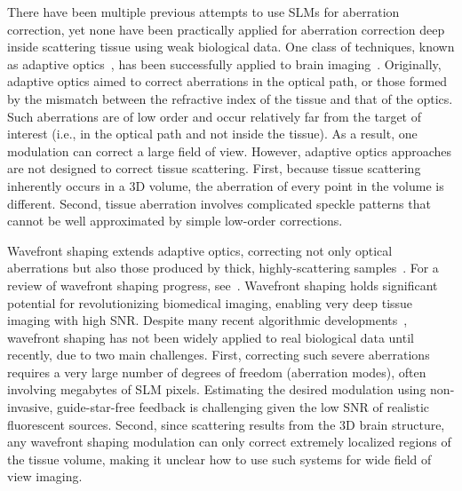  
 There have been multiple previous attempts to use SLMs for aberration correction, yet none have been practically applied for aberration correction deep inside scattering tissue using weak biological data. One class of techniques, known as adaptive optics~\cite{Booth2014,Ji2017review,HampsonBooth21review,wang2015direct}, has been successfully applied to brain imaging~\cite{ji2009adaptive,ji2012characterization,Wang2014Multiplexed,Papadopoulos16,Rodriguez2021Adaptive}. Originally, adaptive optics aimed to correct aberrations in the optical path, or those formed by the mismatch between the refractive index of the tissue and that of the optics. Such aberrations are of low order and occur relatively far from the target of interest (i.e., in the optical path and not inside the tissue). As a result, one modulation can correct a large field of view. However, adaptive optics approaches are not designed to correct tissue scattering. First, because tissue scattering inherently occurs in a 3D volume, the aberration of every point in the volume is different. Second, tissue aberration involves complicated speckle patterns that cannot be well approximated by simple low-order corrections.
 
   
 Wavefront shaping  extends adaptive optics,  correcting not only optical aberrations but also those produced by thick, highly-scattering samples~\cite{Vellekoop:07,Yaqoob2008,Vellekoop2010,Vellekoop2012}. For a review of wavefront shaping progress, see~\cite{Horstmeyer15,YU2015632,Gigan22}. Wavefront shaping holds significant potential for revolutionizing biomedical imaging, enabling very deep tissue imaging with high SNR. Despite many recent algorithmic developments~\cite{Horstmeyer15,Tang2012,Katz:14,Wang20142PAdaptive,Liu2018,Fiolka:12,Jang:13,Xu11,Wang2012,Kong:11,Vellekoop2012,YeminyKatz2021,Stern:19,Daniel:19,Boniface:19,Dror22}, wavefront shaping has not been widely applied to real biological data until recently, due to two main challenges. First, correcting such severe aberrations requires a very large number of degrees of freedom (aberration modes), often involving  megabytes of SLM pixels. Estimating the desired modulation using non-invasive, guide-star-free feedback is challenging given the low SNR of realistic fluorescent sources. Second, since scattering results from the 3D brain structure, any wavefront shaping modulation can only correct extremely localized regions of the tissue volume, making it unclear how to use such systems for wide field of view imaging.
 
